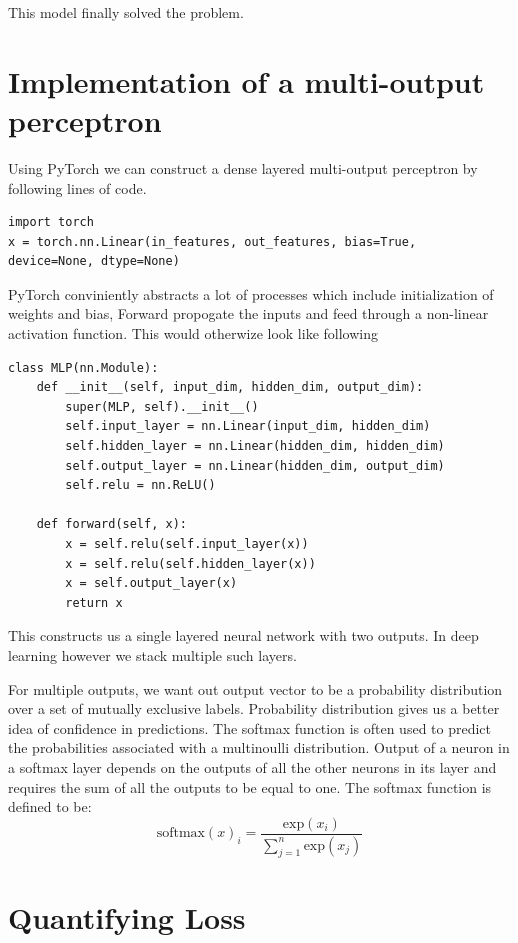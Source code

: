 \documentclass{report}
\begin{document}
This model finally solved the problem.

\section{Implementation of a multi-output perceptron}

Using PyTorch we can construct a dense layered multi-output perceptron by following lines of code.

\begin{verbatim}
import torch
x = torch.nn.Linear(in_features, out_features, bias=True, 
device=None, dtype=None)
\end{verbatim}

PyTorch conviniently abstracts a lot of processes which include initialization of weights and bias, Forward propogate the inputs and feed through a non-linear activation function. This would otherwize look like following

\begin{verbatim}
class MLP(nn.Module):
    def __init__(self, input_dim, hidden_dim, output_dim):
        super(MLP, self).__init__()
        self.input_layer = nn.Linear(input_dim, hidden_dim)
        self.hidden_layer = nn.Linear(hidden_dim, hidden_dim)
	    self.output_layer = nn.Linear(hidden_dim, output_dim)
        self.relu = nn.ReLU()

	def forward(self, x):
	    x = self.relu(self.input_layer(x))
	    x = self.relu(self.hidden_layer(x))
	    x = self.output_layer(x)
	    return x
\end{verbatim}

	This constructs us a single layered neural network with two outputs. In deep learning however we stack multiple such layers.

For multiple outputs, we want out output vector to be a probability distribution over a set of mutually exclusive labels. Probability distribution gives us a better idea of confidence in predictions. The softmax function is often used to predict the probabilities associated with a multinoulli distribution. Output of a neuron in a softmax layer depends on the outputs of all the other neurons in its layer and requires the sum of all the outputs to be equal to one. The softmax function is defined to be:
$$\textrm{softmax}(x)_i = \frac{\textrm{exp}(x_i)}{\sum_{j=1}^n\textrm{exp}(x_j)}$$

\section{Quantifying Loss}
\end{document}
